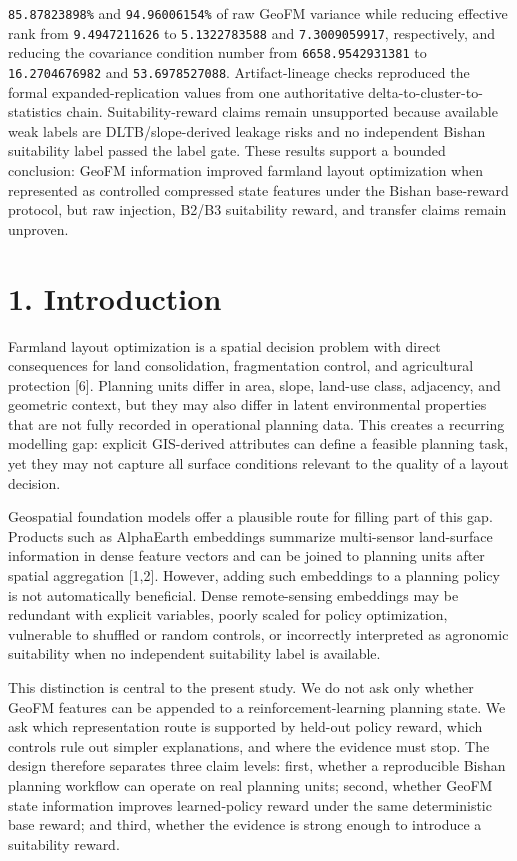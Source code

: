 \documentclass[
  11pt,
  a4paper,
]{article}
\begin{document}
\texttt{85.87823898\%} and \texttt{94.96006154\%} of raw GeoFM variance
while reducing effective rank from \texttt{9.4947211626} to
\texttt{5.1322783588} and \texttt{7.3009059917}, respectively, and
reducing the covariance condition number from \texttt{6658.9542931381}
to \texttt{16.2704676982} and \texttt{53.6978527088}. Artifact-lineage
checks reproduced the formal expanded-replication values from one
authoritative delta-to-cluster-to-statistics chain. Suitability-reward
claims remain unsupported because available weak labels are
DLTB/slope-derived leakage risks and no independent Bishan suitability
label passed the label gate. These results support a bounded conclusion:
GeoFM information improved farmland layout optimization when represented
as controlled compressed state features under the Bishan base-reward
protocol, but raw injection, B2/B3 suitability reward, and transfer
claims remain unproven.

\section{1. Introduction}\label{introduction}

Farmland layout optimization is a spatial decision problem with direct
consequences for land consolidation, fragmentation control, and
agricultural protection {[}6{]}. Planning units differ in area, slope,
land-use class, adjacency, and geometric context, but they may also
differ in latent environmental properties that are not fully recorded in
operational planning data. This creates a recurring modelling gap:
explicit GIS-derived attributes can define a feasible planning task, yet
they may not capture all surface conditions relevant to the quality of a
layout decision.

Geospatial foundation models offer a plausible route for filling part of
this gap. Products such as AlphaEarth embeddings summarize multi-sensor
land-surface information in dense feature vectors and can be joined to
planning units after spatial aggregation {[}1,2{]}. However, adding such
embeddings to a planning policy is not automatically beneficial. Dense
remote-sensing embeddings may be redundant with explicit variables,
poorly scaled for policy optimization, vulnerable to shuffled or random
controls, or incorrectly interpreted as agronomic suitability when no
independent suitability label is available.

This distinction is central to the present study. We do not ask only
whether GeoFM features can be appended to a reinforcement-learning
planning state. We ask which representation route is supported by
held-out policy reward, which controls rule out simpler explanations,
and where the evidence must stop. The design therefore separates three
claim levels: first, whether a reproducible Bishan planning workflow can
operate on real planning units; second, whether GeoFM state information
improves learned-policy reward under the same deterministic base reward;
and third, whether the evidence is strong enough to introduce a
suitability reward.
\end{document}
